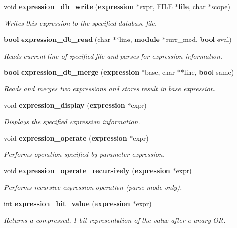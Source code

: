 \begin{CompactItemize}
void {\bf expression\_\-db\_\-write} ({\bf expression} $\ast$expr, FILE $\ast${\bf file}, char $\ast$scope)
\begin{CompactList}\small\item\em Writes this expression to the specified database file.\item\end{CompactList}\item 
{\bf bool} {\bf expression\_\-db\_\-read} (char $\ast$$\ast$line, {\bf module} $\ast$curr\_\-mod, {\bf bool} eval)
\begin{CompactList}\small\item\em Reads current line of specified file and parses for expression information.\item\end{CompactList}\item 
{\bf bool} {\bf expression\_\-db\_\-merge} ({\bf expression} $\ast$base, char $\ast$$\ast$line, {\bf bool} same)
\begin{CompactList}\small\item\em Reads and merges two expressions and stores result in base expression.\item\end{CompactList}\item 
void {\bf expression\_\-display} ({\bf expression} $\ast$expr)
\begin{CompactList}\small\item\em Displays the specified expression information.\item\end{CompactList}\item 
void {\bf expression\_\-operate} ({\bf expression} $\ast$expr)
\begin{CompactList}\small\item\em Performs operation specified by parameter expression.\item\end{CompactList}\item 
void {\bf expression\_\-operate\_\-recursively} ({\bf expression} $\ast$expr)
\begin{CompactList}\small\item\em Performs recursive expression operation (parse mode only).\item\end{CompactList}\item 
int {\bf expression\_\-bit\_\-value} ({\bf expression} $\ast$expr)
\begin{CompactList}\small\item\em Returns a compressed, 1-bit representation of the value after a unary OR.\item\end{CompactList}\item 

\end{CompactItemize}

